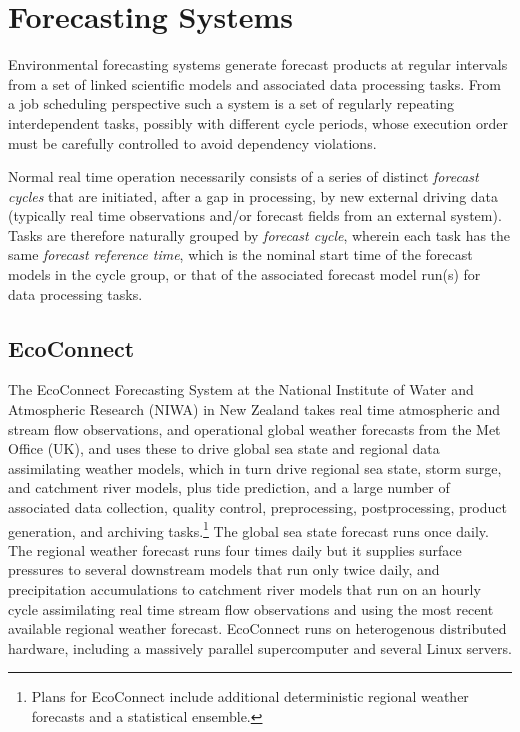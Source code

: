 \documentclass[11pt,a4paper]{article}
\begin{document}
\begin{abstract}
\end{abstract}

\section{Forecasting Systems}
\label{sec:FS}

Environmental forecasting systems generate forecast products at regular
intervals from a set of linked scientific models and associated data
processing tasks. From a job scheduling perspective such a system
is a set of regularly repeating interdependent tasks, possibly with
different cycle periods, whose execution order must be carefully
controlled to avoid dependency violations. 

Normal real time operation necessarily consists of a series of distinct
{\em forecast cycles} that are initiated, after a gap in processing, by
new external driving data (typically real time observations and/or
forecast fields from an external system). Tasks are therefore naturally
grouped by {\em forecast cycle}, wherein each task has the same {\em
forecast reference time}, which is the nominal start time of the
forecast models in the cycle group, or that of the associated forecast
model run(s) for data processing tasks.

\subsection{EcoConnect}

The EcoConnect Forecasting System at the National Institute of Water and
Atmospheric Research (NIWA) in New Zealand takes real time atmospheric
and stream flow observations, and operational global weather forecasts
from the Met Office (UK), and uses these to drive global sea state and
regional data assimilating weather models, which in turn drive regional
sea state, storm surge, and catchment river models, plus tide
prediction, and a large number of associated data collection, quality
control, preprocessing, postprocessing, product generation, and
archiving tasks.\footnote{Plans for EcoConnect include additional
deterministic regional weather forecasts and a statistical ensemble.}
The global sea state forecast runs once daily.  The regional weather
forecast runs four times daily but it supplies surface pressures to
several downstream models that run only twice daily, and precipitation
accumulations to catchment river models that run on an hourly cycle
assimilating real time stream flow observations and using the most
recent available regional weather forecast.  EcoConnect runs on
heterogenous distributed hardware, including a massively parallel
supercomputer and several Linux servers. 
\end{document}
